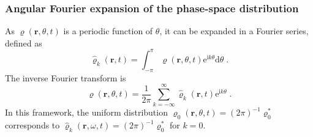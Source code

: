 \documentclass{article}
\begin{document}
\subsubsection{Angular Fourier expansion of the phase-space distribution}
As $\varrho(\mathbf{r},\theta,t)$ is a periodic function of $\theta$, it can be expanded in a Fourier series, defined as
\begin{equation}
    \hat{\varrho}_k(\mathbf{r},t)=\int_{-\pi}^\pi \varrho(\mathbf{r},\theta,t) \mathrm{e}^{\mathrm{i}k\theta}\mathrm{d}\theta\;.
\end{equation}
The inverse Fourier transform is
\begin{equation}
    \label{eq:inverseFourier}
    \varrho (\mathbf{r},\theta ,t)=\frac{1}{2\pi}\sum_{k=-\infty}^{\infty}{\hat{\varrho}_k(\mathbf{r},t)\mathrm{e}^{\mathrm{i}k\theta}\;.}
\end{equation}
In this framework, the uniform distribution $\varrho _0(\mathbf{r},\theta ,t)=\left( 2\pi \right) ^{-1}\varrho _{0}^{*}$ corresponds to $\hat{\varrho}_k(\mathbf{r},\omega,t)=\left( 2\pi \right) ^{-1}\varrho _{0}^{*}$ for $k=0$.
\end{document}

